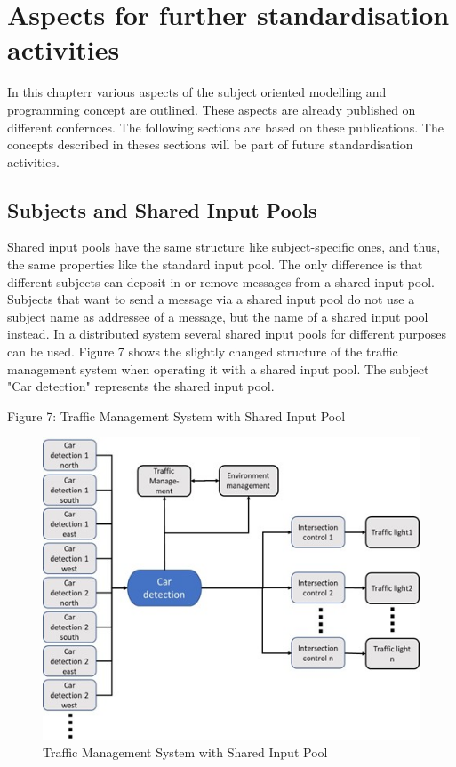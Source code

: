 \chapter{Aspects for further standardisation activities}
In this chapterr various aspects of the subject oriented modelling and programming concept are outlined. These aspects are already published on different confernces. The following sections are based on these publications.
The concepts described in theses sections will be part of future standardisation activities.

\section{Subjects and Shared Input Pools}

Shared input pools have the same structure like subject-specific ones, and thus, the same properties like the standard input pool. The only difference is that different subjects can deposit in or remove messages from a shared input pool. Subjects that want to send a message via a shared input pool do not use a subject name as addressee of a message, but the name of a shared input pool instead. In a distributed system several shared input pools for different purposes can be used. Figure 7 shows the slightly changed structure of the traffic management system when operating it with a shared input pool. The subject "Car detection" represents the shared input pool.


Figure 7: Traffic Management System with Shared Input Pool

\begin{figure}
	\centering
	\includegraphics[width=0.7\linewidth]{Figures/Chapter5/figuresshared/SharedInputPoolExample.jpg}
	\caption[Traffic Management System with Shared Input Pool]{Traffic Management System with Shared Input Pool}
	\label{fig:SharedInputPooTraffic}
\end{figure}


